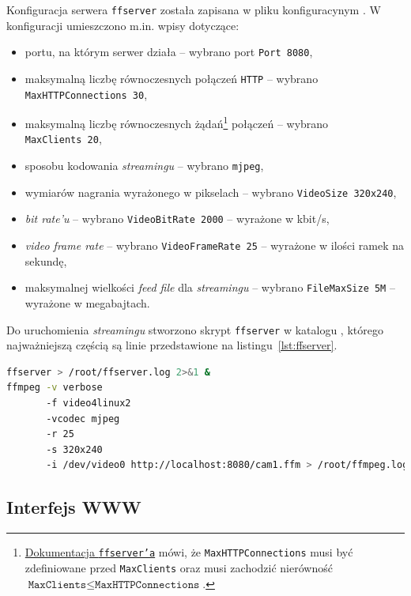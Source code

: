 \documentclass{article}
\begin{document}
Konfiguracja serwera \texttt{ffserver} została zapisana w pliku konfiguracynym . W konfiguracji umieszczono m.in. wpisy dotyczące:
\begin{itemize}
	\item portu, na którym serwer działa -- wybrano port \texttt{Port~8080},
	\item maksymalną liczbę równoczesnych połączeń \texttt{HTTP} -- wybrano \texttt{MaxHTTPConnections~30},
	\item maksymalną liczbę równoczesnych żądań\footnote{\href{https://www.ffmpeg.org/ffserver.html}{Dokumentacja \texttt{ffserver'a}} mówi, że \texttt{MaxHTTPConnections} musi być zdefiniowane przed \texttt{MaxClients} oraz musi zachodzić nierówność $\texttt{MaxClients}\leq\texttt{MaxHTTPConnections}$.} połączeń -- wybrano \texttt{MaxClients~20},
	\item sposobu kodowania \emph{streamingu} -- wybrano \texttt{mjpeg},
	\item wymiarów nagrania wyrażonego w pikselach -- wybrano \texttt{VideoSize~320x240},
	\item \emph{bit rate'u} -- wybrano \texttt{VideoBitRate~2000} -- wyrażone w kbit/s,
	\item \emph{video frame rate} -- wybrano \texttt{VideoFrameRate 25} -- wyrażone w ilości ramek na sekundę,
	\item maksymalnej wielkości \emph{feed file} dla \emph{streamingu} -- wybrano \texttt{FileMaxSize~5M} -- wyrażone w megabajtach.
\end{itemize}

Do uruchomienia \emph{streamingu} stworzono skrypt \texttt{ffserver} w katalogu , którego najważniejszą częścią są linie przedstawione na listingu~\ref{lst:ffserver}.
\begin{lstlisting}[caption={Zawartość pliku \texttt{/etc/init.d/ffserver}},label=lst:ffserver,language=bash,frame=single,breaklines,captionpos=b]
ffserver > /root/ffserver.log 2>&1 &
ffmpeg -v verbose
       -f video4linux2
       -vcodec mjpeg
       -r 25
       -s 320x240
       -i /dev/video0 http://localhost:8080/cam1.ffm > /root/ffmpeg.log 2>&1 &
\end{lstlisting}


\subsection{Interfejs WWW}
\label{sec:www}
\end{document}
